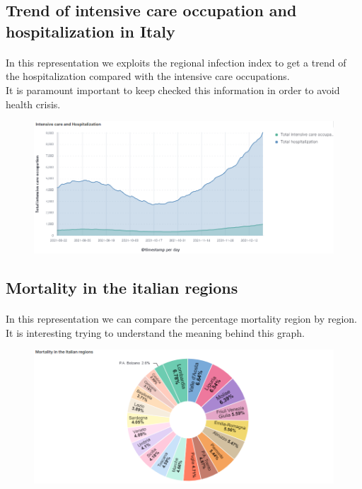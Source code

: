 \documentclass[a4paper,12pt]{article}
\begin{document}
\subsection{Trend of intensive care occupation and hospitalization in Italy}
\paragraph{}In this representation we exploits the regional infection index to get a trend of the hospitalization compared with the intensive care occupations. \\It is paramount important to keep checked this information in order to avoid health crisis.
\begin{figure}[h]
	\centering
  \includegraphics[width=\linewidth]{dashboards/dash8.png}
\end{figure}

\subsection{Mortality in the italian regions}
\paragraph{}In this representation we can compare the percentage mortality region by region.
It is interesting trying to understand the meaning behind this graph.
\begin{figure}[h]
	\centering
  \includegraphics[width=\linewidth]{dashboards/dash9.png}
\end{figure}
\end{document}
